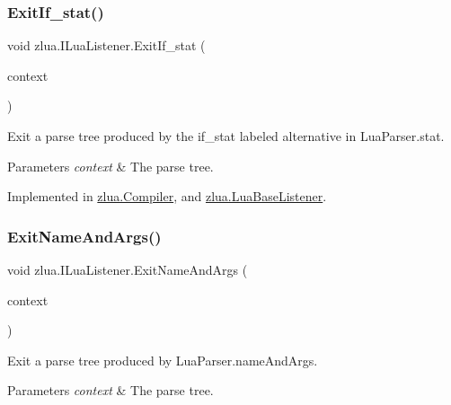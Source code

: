 \subsubsection{\texorpdfstring{Exit\+If\+\_\+stat()}{ExitIf\_stat()}}
{\footnotesize\ttfamily void zlua.\+I\+Lua\+Listener.\+Exit\+If\+\_\+stat (\begin{DoxyParamCaption}\item[{\mbox{[}\+Not\+Null\mbox{]} \mbox{\hyperlink{classzlua_1_1_lua_parser_1_1_if__stat_context}{Lua\+Parser.\+If\+\_\+stat\+Context}}}]{context }\end{DoxyParamCaption})}



Exit a parse tree produced by the {\ttfamily if\+\_\+stat} labeled alternative in Lua\+Parser.\+stat. 


\begin{DoxyParams}{Parameters}
{\em context} & The parse tree.\\
\hline
\end{DoxyParams}


Implemented in \mbox{\hyperlink{classzlua_1_1_compiler_afca7da08ee84a7b0797de722420b443a}{zlua.\+Compiler}}, and \mbox{\hyperlink{classzlua_1_1_lua_base_listener_aadcd2b60bcec7dda7b397a674e1d6082}{zlua.\+Lua\+Base\+Listener}}.

\mbox{\label{interfacezlua_1_1_i_lua_listener_a1f6a7b27829eca2db7ed31a06cc3ae38}} 
\subsubsection{\texorpdfstring{Exit\+Name\+And\+Args()}{ExitNameAndArgs()}}
{\footnotesize\ttfamily void zlua.\+I\+Lua\+Listener.\+Exit\+Name\+And\+Args (\begin{DoxyParamCaption}\item[{\mbox{[}\+Not\+Null\mbox{]} \mbox{\hyperlink{classzlua_1_1_lua_parser_1_1_name_and_args_context}{Lua\+Parser.\+Name\+And\+Args\+Context}}}]{context }\end{DoxyParamCaption})}



Exit a parse tree produced by Lua\+Parser.\+name\+And\+Args. 


\begin{DoxyParams}{Parameters}
{\em context} & The parse tree.\\
\hline
\end{DoxyParams}


